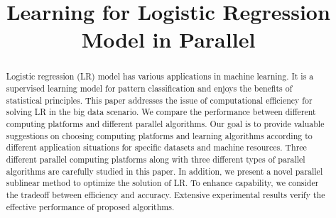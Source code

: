\documentclass[10pt, conference, compsocconf]{IEEEtran}
\begin{document}
\title{Learning for Logistic Regression Model in Parallel}

\author{
\and
{}
\and
{}
\and
{}
\and
{}
}

\maketitle

\begin{abstract}
Logistic regression (LR) model has various applications in machine learning.
It is a supervised learning model for pattern classification and enjoys the benefits of statistical principles.
This paper addresses the issue of computational efficiency for solving LR in the big data scenario.
We compare the performance between different computing platforms and different parallel algorithms.
Our goal is to provide valuable suggestions on choosing computing platforms and learning algorithms according to different application situations for specific datasets and machine resources.
Three different parallel computing platforms along with three different types of parallel algorithms are carefully studied in this paper.
In addition, we present a novel parallel sublinear method to optimize the solution of LR.
To enhance capability, we consider the tradeoff between efficiency and accuracy. Extensive experimental results verify the effective performance of proposed algorithms.
\end{abstract}
\end{document}
